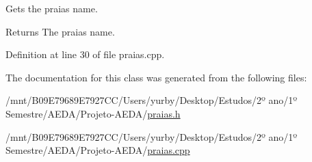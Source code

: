 Gets the praia\textquotesingle{}s name. 

\begin{DoxyReturn}{Returns}
The praia\textquotesingle{}s name. 
\end{DoxyReturn}


Definition at line 30 of file praias.\+cpp.



The documentation for this class was generated from the following files\+:\begin{DoxyCompactItemize}
\item 
/mnt/\+B09\+E79689\+E7927\+C\+C/\+Users/yurby/\+Desktop/\+Estudos/2º ano/1º Semestre/\+A\+E\+D\+A/\+Projeto-\/\+A\+E\+D\+A/\hyperlink{praias_8h}{praias.\+h}\item 
/mnt/\+B09\+E79689\+E7927\+C\+C/\+Users/yurby/\+Desktop/\+Estudos/2º ano/1º Semestre/\+A\+E\+D\+A/\+Projeto-\/\+A\+E\+D\+A/\hyperlink{praias_8cpp}{praias.\+cpp}\end{DoxyCompactItemize}
